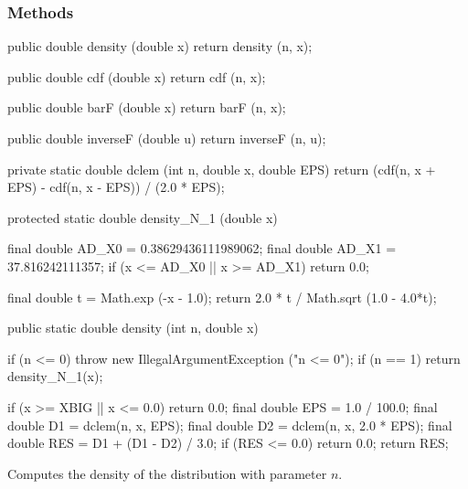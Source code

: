 \subsubsection* {Methods}

\begin{code}\begin{hide}

   public double density (double x) {
      return density (n, x);
   }

   public double cdf (double x) {
      return cdf (n, x);
   }

   public double barF (double x) {
      return barF (n, x);
   }

   public double inverseF (double u) {
      return inverseF (n, u);
   }

   private static double dclem (int n, double x, double EPS) {
      return (cdf(n, x + EPS) - cdf(n, x - EPS)) / (2.0 * EPS);
   }

   protected static double density_N_1 (double x)
   {
      final double AD_X0 = 0.38629436111989062;
      final double AD_X1 = 37.816242111357;
      if (x <= AD_X0 || x >= AD_X1)
         return 0.0;

      final double t = Math.exp (-x - 1.0);
      return 2.0 * t / Math.sqrt (1.0 - 4.0*t); 
   }\end{hide}

   public static double density (int n, double x)\begin{hide} {
      if (n <= 0)
         throw new IllegalArgumentException ("n <= 0");
      if (n == 1) 
         return density_N_1(x);

      if (x >= XBIG || x <= 0.0)
         return 0.0;
      final double EPS = 1.0 / 100.0;
      final double D1 = dclem(n, x, EPS);
      final double D2 = dclem(n, x, 2.0 * EPS);
      final double RES = D1 + (D1 - D2) / 3.0;
      if (RES <= 0.0)
         return 0.0;
      return RES;
   }\end{hide}
\end{code}
\begin{tabb} Computes the density of the \ad{} distribution with parameter $n$.
\end{tabb}
